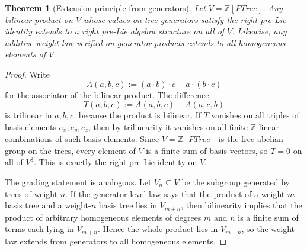 \documentclass[11pt]{article}
\newtheorem{theorem}{Theorem}
\newcommand{\PTree}{\mathit{PTree}}
\begin{document}
\begin{theorem}[Extension principle from generators]
Let \(V=\mathbb Z[\PTree]\). Any bilinear product on \(V\) whose values on tree
generators satisfy the right pre-Lie identity extends to a right pre-Lie
algebra structure on all of \(V\). Likewise, any additive weight law verified
on generator products extends to all homogeneous elements of \(V\).
\end{theorem}

\begin{proof}
Write
\[
A(a,b,c):=(a\cdot b)\cdot c-a\cdot (b\cdot c)
\]
for the associator of the bilinear product. The difference
\[
T(a,b,c):=A(a,b,c)-A(a,c,b)
\]
is trilinear in \(a,b,c\), because the product is bilinear. If \(T\) vanishes
on all triples of basis elements \(e_x,e_y,e_z\), then by trilinearity it
vanishes on all finite \(\mathbb Z\)-linear combinations of such basis
elements. Since \(V=\mathbb Z[\PTree]\) is the free abelian group on the trees,
every element of \(V\) is a finite sum of basis vectors, so \(T=0\) on all of
\(V^3\). This is exactly the right pre-Lie identity on \(V\).

The grading statement is analogous. Let \(V_n\subseteq V\) be the subgroup
generated by trees of weight \(n\). If the generator-level law says that the
product of a weight-\(m\) basis tree and a weight-\(n\) basis tree lies in
\(V_{m+n}\), then bilinearity implies that the product of arbitrary homogeneous
elements of degrees \(m\) and \(n\) is a finite sum of terms each lying in
\(V_{m+n}\). Hence the whole product lies in \(V_{m+n}\), so the weight law
extends from generators to all homogeneous elements.
\end{proof}
\end{document}
